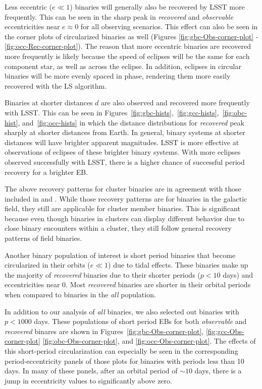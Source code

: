 \documentclass[twocolumn]{aastex63}
\begin{document}
Less eccentric ($e \ll 1$) binaries will generally also be recovered by LSST more frequently. This can be seen in the sharp peak in \textit{recovered} and \textit{observable} eccentricities near $e \approx 0$ for all observing scenarios. This effect can also be seen in the corner plots of circularized binaries as well (Figures \ref{fig:gbc-Obs-corner-plot} - \ref{fig:occ-Rec-corner-plot}). The reason that more eccentric binaries are recovered more frequently is likely because the speed of eclipses will be the same for each component star, as well as across the eclipse. In addition, eclipses in circular binaries will be more evenly spaced in phase, rendering them more easily recovered with the LS algorithm.

Binaries at shorter distances $d$  are also observed and recovered more frequently with LSST. This can be seen in Figures~\ref{fig:gbc-hists},~\ref{fig:gcc-hists},~\ref{fig:obc-hist}, and~\ref{fig:occ-hists} in which the distance distributions for \textit{recovered} peak sharply at shorter distances from Earth. In general, binary systems at shorter distances will have brighter apparent magnitudes. LSST is more effective at observations of eclipses of these brighter binary systems. With more eclipses observed successfully with LSST, there is a higher chance of successful period recovery for a brighter EB. 

The above recovery patterns for cluster binaries are in agreement with those included in \citet{2019AAS...23336317P} and \citet{2011AJ....142...52P}. While those recovery patterns are for binaries in the galactic field, they still are applicable for cluster member binaries. This is significant because even though binaries in clusters can display different behavior due to close binary encounters within a cluster, they still follow general recovery patterns of field binaries. 

Another binary population of interest is short period binaries that become circularized in their orbits ($e \ll 1$) due to tidal effects. These binaries make up the majority of \textit{recovered} binaries due to their shorter periods ($p < 10$ days) and eccentricities near 0. 
Most \textit{recovered} binaries are shorter in their orbital periods when compared to binaries in the \textit{all} population. 

In addition to our analysis of \textit{all} binaries, we also selected out binaries with $\textit{p} < 1000$ days. These populations of short period EBs for both \textit{observable} and \textit{recovered} binares are shown in Figures~\ref{fig:gbc-Obs-corner-plot}, \ref{fig:gcc-Obs-corner-plot} \ref{fig:obc-Obs-corner-plot}, and \ref{fig:occ-Obs-corner-plot}. The effects of this short-period circularization can especially be seen in the corresponding period-eccentricity panels of those plots for binaries with periods less than 10 days. In many of these panels, after an orbital period of $\sim 10$ days, there is a jump in eccentricity values to significantly above zero.
\end{document}
